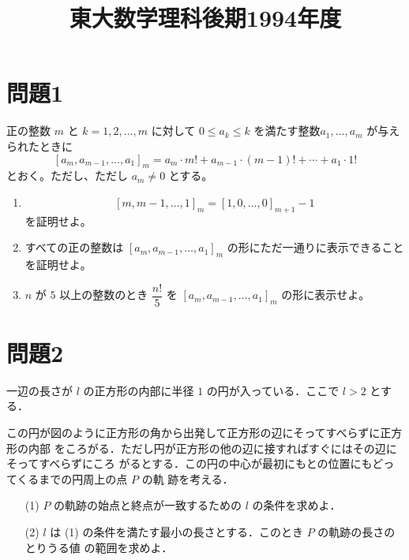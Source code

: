 \documentclass[unicode,12pt, A4j]{ltjsarticle}%
\title{東大数学理科後期1994年度}
\author{}
\date{}
\begin{document}
\maketitle

\section{問題1}
正の整数 $m$ と $k = 1, 2, \dots, m$ に対して $0 \leq a_k \leq k$ を満たす整数$a_1, \dots, a_m$ が与えられたときに
\[
[a_m, a_{m-1}, \dots, a_1]_m = a_m \cdot m! + a_{m-1} \cdot (m-1)! + \cdots + a_1 \cdot 1!
\]
とおく。ただし、ただし $a_m \neq 0$ とする。
\begin{enumerate}
  \item 
  \[
    [m, m-1, \dots, 1]_m = [1, 0, \dots, 0]_{m+1} - 1
  \]
  を証明せよ。
  \item すべての正の整数は $[a_m, a_{m-1}, \dots, a_1]_m$ の形にただ一通りに表示できることを証明せよ。
  \item $n$ が $5$ 以上の整数のとき $\dfrac{n!}{5}$ を $[a_m, a_{m-1}, \dots, a_1]_m$ の形に表示せよ。
\end{enumerate}

\section{問題2}
一辺の長さが $l$ の正方形の内部に半径 $1$ の円が入っている．ここで $l > 2$ とする．

この円が図のように正方形の角から出発して正方形の辺にそってすべらずに正方形の内部
をころがる．ただし円が正方形の他の辺に接すればすぐにはその辺にそってすべらずにころ
がるとする．この円の中心が最初にもとの位置にもどってくるまでの円周上の点 $P$ の軌
跡を考える．

\begin{enumerate}
\item[(1)] $P$ の軌跡の始点と終点が一致するための $l$ の条件を求めよ．
\item[(2)] $l$ は (1) の条件を満たす最小の長さとする．このとき $P$ の軌跡の長さのとりうる値
の範囲を求めよ．
\end{enumerate}

\begin{figure}[h]
\centering
{}
\end{figure}
\end{document}
